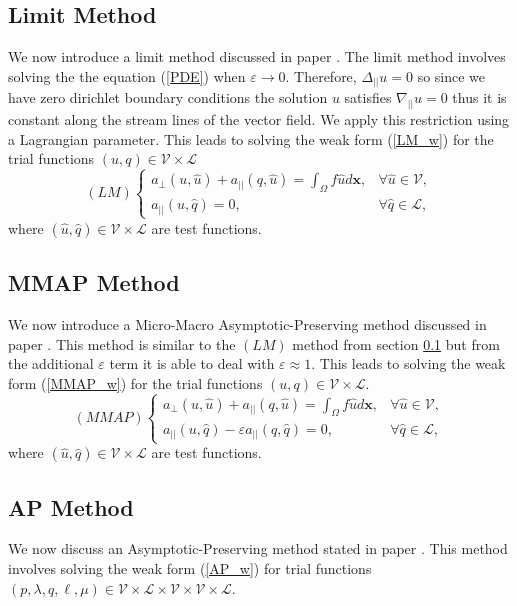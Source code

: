 \documentclass[12pt]{ociamthesis}
\begin{document}
\subsection{Limit Method} \label{LM}
We now introduce a limit method discussed in paper \cite{AP}. The limit method involves solving the the equation (\ref{PDE}) when $\varepsilon \rightarrow 0$. Therefore, $\Delta_{||}u=0$ so since we have zero dirichlet boundary conditions the solution $u$ satisfies $\nabla_{||}u=0$ thus it is constant along the stream lines of the vector field. We apply this restriction using a Lagrangian parameter. This leads to solving the weak form (\ref{LM_w}) for the trial functions $(u, q) \in \mathcal{V} \times \mathcal{L}$ 
\begin{equation} \label{LM_w}
(LM)
\begin{cases}
a_{\perp}(u, \hat{u}) + a_{||}(q, \hat{u}) = \int_{\Omega} f \hat{u} d\mathbf{x}, 
&\forall \hat{u} \in \mathcal{V},\\
a_{||}(u, \hat{q}) = 0, & \forall \hat{q} \in \mathcal{L},
\end{cases}
\end{equation}
where $(\hat{u}, \hat{q}) \in \mathcal{V} \times \mathcal{L}$ are test functions.

\subsection{MMAP Method} \label{MMAP}
We now introduce a Micro-Macro Asymptotic-Preserving method discussed in paper \cite{MMAP}. This method is similar to the $(LM)$ method from section \ref{LM} but from the additional $\varepsilon$ term it is able to deal with $\varepsilon \approx 1$. This leads to solving the weak form (\ref{MMAP_w}) for the trial functions $(u, q) \in  \mathcal{V} \times \mathcal{L}$. 
\begin{equation} \label{MMAP_w}
(MMAP)
\begin{cases}
a_{\perp}(u, \hat{u}) + a_{||}(q, \hat{u}) = \int_{\Omega} f \hat{u} d\mathbf{x}, 
&\forall \hat{u} \in \mathcal{V}, \\
a_{||}(u, \hat{q}) - \varepsilon a_{||}(q, \hat{q}) = 0, 
&\forall \hat{q} \in \mathcal{L},
\end{cases}
\end{equation}
where $(\hat{u}, \hat{q}) \in \mathcal{V}\times \mathcal{L} $ are test functions.

\subsection{AP Method} \label{AP}
We now discuss an Asymptotic-Preserving method stated in paper \cite{AP}. This method involves solving the weak form (\ref{AP_w}) for trial functions $(p, \lambda, q, \ell, \mu) \in \mathcal{V} \times \mathcal{L}  \times \mathcal{V}  \times \mathcal{V}  \times \mathcal{L}$.
\end{document}
